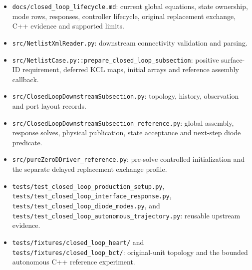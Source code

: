 \documentclass[11pt,a4paper]{article}
\begin{document}
\begin{itemize}
\item \texttt{docs/\allowbreak{}closed\_\allowbreak{}loop\_\allowbreak{}lifecycle.\allowbreak{}md}: current global equations, state ownership, mode rows, responses, controller lifecycle, original replacement exchange, C++ evidence and supported limits.


\item \texttt{src/\allowbreak{}Netlist\allowbreak{}Xml\allowbreak{}Reader.\allowbreak{}py}: downstream connectivity validation and parsing.


\item \texttt{src/\allowbreak{}Netlist\allowbreak{}Case.\allowbreak{}py:\allowbreak{}:\allowbreak{}prepare\_\allowbreak{}closed\_\allowbreak{}loop\_\allowbreak{}subsection}: positive surface-ID requirement, deferred KCL maps, initial arrays and reference assembly callback.


\item \texttt{src/\allowbreak{}Closed\allowbreak{}Loop\allowbreak{}Downstream\allowbreak{}Subsection.\allowbreak{}py}: topology, history, observation and port layout records.


\item \texttt{src/\allowbreak{}Closed\allowbreak{}Loop\allowbreak{}Downstream\allowbreak{}Subsection\_\allowbreak{}reference.\allowbreak{}py}: global assembly, response solves, physical publication, state acceptance and next-step diode predicate.


\item \texttt{src/\allowbreak{}pure\allowbreak{}Zero\allowbreak{}DDriver\_\allowbreak{}reference.\allowbreak{}py}: pre-solve controlled initialization and the separate delayed replacement exchange profile.


\item \texttt{tests/\allowbreak{}test\_\allowbreak{}closed\_\allowbreak{}loop\_\allowbreak{}production\_\allowbreak{}setup.\allowbreak{}py}, \texttt{tests/\allowbreak{}test\_\allowbreak{}closed\_\allowbreak{}loop\_\allowbreak{}interface\_\allowbreak{}response.\allowbreak{}py}, \texttt{tests/\allowbreak{}test\_\allowbreak{}closed\_\allowbreak{}loop\_\allowbreak{}diode\_\allowbreak{}modes.\allowbreak{}py}, and \texttt{tests/\allowbreak{}test\_\allowbreak{}closed\_\allowbreak{}loop\_\allowbreak{}autonomous\_\allowbreak{}trajectory.\allowbreak{}py}: reusable upstream evidence.


\item \texttt{tests/\allowbreak{}fixtures/\allowbreak{}closed\_\allowbreak{}loop\_\allowbreak{}heart/\allowbreak{}} and \texttt{tests/\allowbreak{}fixtures/\allowbreak{}closed\_\allowbreak{}loop\_\allowbreak{}bct/\allowbreak{}}: original-unit topology and the bounded autonomous C++ reference experiment.


\end{itemize}
\end{document}
